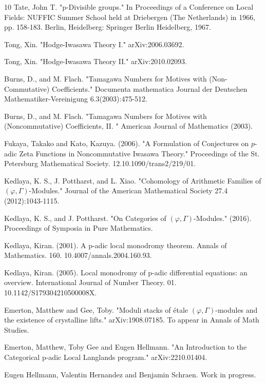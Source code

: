 \documentclass[12pt]{article}
\theoremstyle{definition}
\numberwithin{equation}{section}
\begin{document}
\begin{thebibliography}{10}
 Tate, John T. "p-Divisible groups." In Proceedings of a Conference on Local Fields: NUFFIC Summer School held at Driebergen (The Netherlands) in 1966, pp. 158-183. Berlin, Heidelberg: Springer Berlin Heidelberg, 1967.

 Tong, Xin. "Hodge-Iwasawa Theory I." arXiv:2006.03692.

 Tong, Xin. "Hodge-Iwasawa Theory II." arXiv:2010.02093.

 Burns, D., and  M. Flach. "Tamagawa Numbers for Motives with (Non-Commutative) Coefficients." Documenta mathematica Journal der Deutschen Mathematiker-Vereinigung 6.3(2003):475-512.

 Burns, D., and M. Flach. "Tamagawa Numbers for Motives with (Noncommutative) Coefficients, II. " American Journal of Mathematics (2003).

 Fukaya, Takako and Kato, Kazuya. (2006). "A Formulation of Conjectures on $p$-adic Zeta Functions in Noncommutative Iwasawa Theory." Proceedings of the St. Petersburg Mathematical Society. 12.10.1090/trans2/219/01.

 Kedlaya, K. S.,  J. Pottharst, and  L. Xiao. "Cohomology of Arithmetic Families of $(\varphi,\Gamma)$-Modules." Journal of the American Mathematical Society 27.4 (2012):1043-1115.

 Kedlaya, K. S., and  J. Pottharst. "On Categories of $(\varphi, \Gamma)$-Modules." (2016). Proceedings of Symposia in Pure Mathematics.

 Kedlaya, Kiran. (2001). A p-adic local monodromy theorem. Annals of Mathematics. 160. 10.4007/annals.2004.160.93. 

 Kedlaya, Kiran. (2005). Local monodromy of p-adic differential equations: an overview. International Journal of Number Theory. 01. 10.1142/S179304210500008X. 

 Emerton, Matthew and Gee, Toby. "Moduli stacks of \'etale $(\varphi,\Gamma)$-modules and the existence of crystalline lifts." arXiv:1908.07185. To appear in Annals of Math Studies.

 Emerton, Matthew, Toby Gee and Eugen Hellmann. "An Introduction to the Categorical p-adic Local Langlands program." arXiv:2210.01404.

 Eugen Hellmann, Valentin Hernandez and Benjamin Schraen. Work in progress.


\end{thebibliography}
\end{document}
